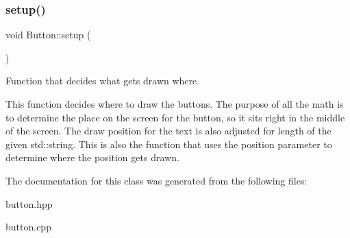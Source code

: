 \subsubsection{\texorpdfstring{setup()}{setup()}}
{\footnotesize\ttfamily void Button\+::setup (\begin{DoxyParamCaption}{ }\end{DoxyParamCaption})}



Function that decides what gets drawn where. 

This function decides where to draw the buttons. The purpose of all the math is to determine the place on the screen for the button, so it sits right in the middle of the screen. The draw position for the text is also adjusted for length of the given std\+::string. This is also the function that uses the position parameter to determine where the position gets drawn. 

The documentation for this class was generated from the following files\+:\begin{DoxyCompactItemize}
\item 
button.\+hpp\item 
button.\+cpp\end{DoxyCompactItemize}
